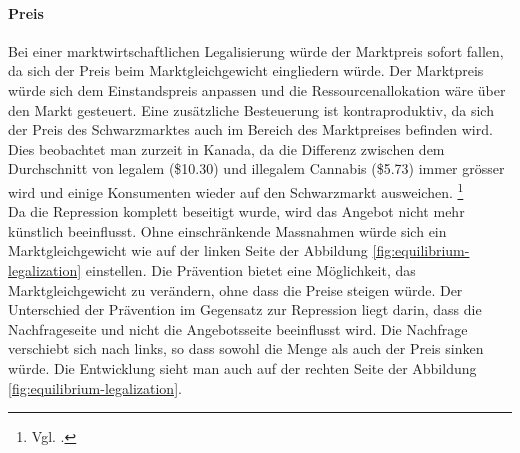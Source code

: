 \documentclass[../main.tex]{subfiles}
\begin{document}
	 \paragraph{Preis}
	 Bei einer marktwirtschaftlichen Legalisierung würde der Marktpreis sofort fallen, da sich der Preis beim Marktgleichgewicht eingliedern würde. 
	 Der Marktpreis würde sich dem Einstandspreis anpassen und die Ressourcenallokation wäre über den Markt gesteuert.
	 Eine zusätzliche Besteuerung ist kontraproduktiv, da sich der Preis des Schwarzmarktes auch im Bereich des Marktpreises befinden wird.
	 Dies beobachtet man zurzeit in Kanada, da die Differenz zwischen dem Durchschnitt von legalem (\$10.30) und illegalem Cannabis (\$5.73) immer grösser wird und einige Konsumenten wieder auf den Schwarzmarkt ausweichen.%
	 \footnote{Vgl. \cite{cbc-01}.}\\
	 
	 \noindent
	 Da die Repression komplett beseitigt wurde, wird das Angebot nicht mehr künstlich beeinflusst.
	 Ohne einschränkende Massnahmen würde sich ein Marktgleichgewicht wie auf der linken Seite der Abbildung \ref{fig:equilibrium-legalization} einstellen.
	 Die Prävention bietet eine Möglichkeit, das Marktgleichgewicht zu verändern, ohne dass die Preise steigen würde.
	 Der Unterschied der Prävention im Gegensatz zur Repression liegt darin, dass die Nachfrageseite und nicht die Angebotsseite beeinflusst wird.
	 Die Nachfrage verschiebt sich nach links, so dass sowohl die Menge als auch der Preis sinken würde.
	 Die Entwicklung sieht man auch auf der rechten Seite der Abbildung \ref{fig:equilibrium-legalization}.
	 
\end{document}
